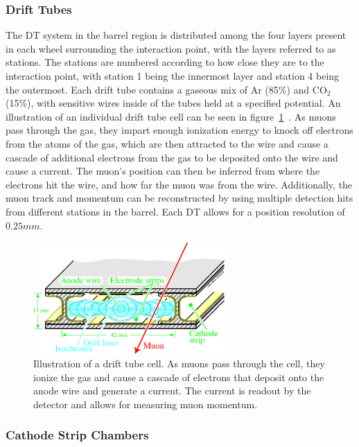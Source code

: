 \subsubsection{Drift Tubes}

The DT system in the barrel region is distributed among the four layers present in each wheel surrounding the interaction point, with the layers referred to as stations.
The stations are numbered according to how close they are to the interaction point, with station 1 being the innermost layer and station 4 being the outermost.
Each drift tube contains a gaseous mix of Ar (85\%) and CO$_2$ (15\%), with sensitive wires inside of the tubes held at a specified potential.
An illustration of an individual drift tube cell can be seen in figure~\ref{fig:CMSDTcell}~\cite{Abbiendi_2019}.
As muons pass through the gas, they impart enough ionization energy to knock off electrons from the atoms of the gas, which are then attracted to the wire and cause a cascade of additional electrons from the gas to be deposited onto the wire and cause a current.
The muon's position can then be inferred from where the electrons hit the wire, and how far the muon was from the wire.
Additionally, the muon track and momentum can be reconstructed by using multiple detection hits from different stations in the barrel.
Each DT allows for a position resolution of $0.25\unit{mm}$.

\begin{figure}[htbp]
  \centering
  \includegraphics[width=0.65\textwidth]{fig/experiment/cms_DTcell.pdf}
  \caption{
    Illustration of a drift tube cell.
    As muons pass through the cell, they ionize the gas and cause a cascade of electrons that deposit onto the anode wire and generate a current.
    The current is readout by the detector and allows for measuring muon momentum.
  }
  \label{fig:CMSDTcell}
\end{figure}

\subsubsection{Cathode Strip Chambers}

